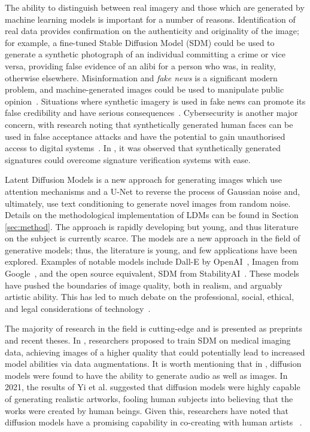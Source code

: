 \documentclass{article}
\begin{document}
The ability to distinguish between real imagery and those which are generated by machine learning models is important for a number of reasons. Identification of real data provides confirmation on the authenticity and originality of the image; for example, a fine-tuned Stable Diffusion Model (SDM) could be used to generate a synthetic photograph of an individual committing a crime or vice versa, providing false evidence of an alibi for a person who was, in reality, otherwise elsewhere. Misinformation and \textit{fake news} is a significant modern problem, and machine-generated images could be used to manipulate public opinion~\cite{pennycook2021psychology,singh2022predicting}. Situations where synthetic imagery is used in fake news can promote its false credibility and have serious consequences~\cite{bonettini2021use}. Cybersecurity is another major concern, with research noting that synthetically generated human faces can be used in false acceptance attacks and have the potential to gain unauthorised access to digital systems~\cite{deb2020advfaces,khosravy2021model}. In \cite{BIRD2023170}, it was observed that synthetically generated signatures could overcome signature verification systems with ease. 

Latent Diffusion Models is a new approach for generating images which use attention mechanisms and a U-Net to reverse the process of Gaussian noise and, ultimately, use text conditioning to generate novel images from random noise. Details on the methodological implementation of LDMs can be found in Section \ref{sec:method}. The approach is rapidly developing but young, and thus literature on the subject is currently scarce. The models are a new approach in the field of generative models; thus, the literature is young, and few applications have been explored. Examples of notable models include Dall-E by OpenAI~\cite{ramesh2021zero}, Imagen from Google~\cite{saharia2022photorealistic}, and the open source equivalent, SDM from StabilityAI~\cite{rombach2022high}. These models have pushed the boundaries of image quality, both in realism, and arguably artistic ability. This has led to much debate on the professional, social, ethical, and legal considerations of technology~\cite{roose2022ai}. 

The majority of research in the field is cutting-edge and is presented as preprints and recent theses. In \cite{chambon2022adapting}, researchers proposed to train SDM on medical imaging data, achieving images of a higher quality that could potentially lead to increased model abilities via data augmentations. It is worth mentioning that in \cite{schneider2023mo,schneider2023thesis}, diffusion models were found to have the ability to generate audio as well as images. In 2021, the results of Yi et al.\cite{yi2021exploring} suggested that diffusion models were highly capable of generating realistic artworks, fooling human subjects into believing that the works were created by human beings. Given this, researchers have noted that diffusion models have a promising capability in co-creating with human artists ~\cite{guo2023artverse}. 
\end{document}
